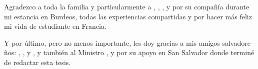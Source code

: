 \begin{otherlanguage}{spanish}
  Agradezco a toda la familia  y particularmente a
  \mbox{}, ,
  ,  y 
  por su compañía durante mi estancia en Burdeos, todas las experiencias
  compartidas y por hacer más feliz mi vida de estudiante en Francia.

  Y por último, pero no menos importante, les doy gracias a mis amigos
  salvadoreños: , ,
   y , y también al
  Ministro ,  y
   por su apoyo en San Salvador donde terminé de
  redactar esta tesis.
\end{otherlanguage}
